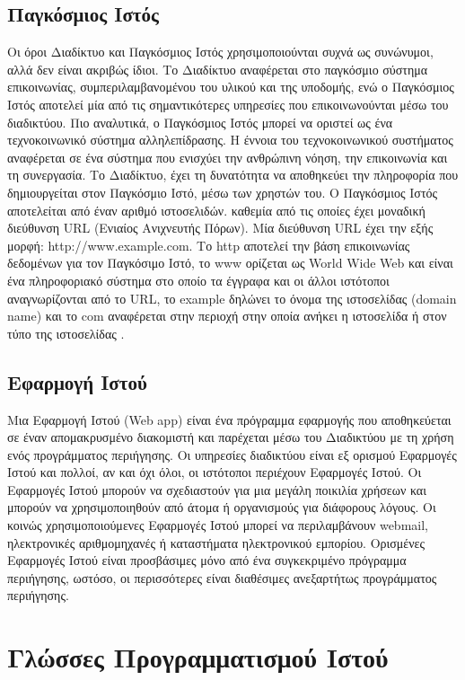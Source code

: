 \subsection{Παγκόσμιος Ιστός}
Οι όροι Διαδίκτυο και Παγκόσμιος Ιστός χρησιμοποιούνται συχνά ως συνώνυμοι, αλλά δεν είναι ακριβώς ίδιοι. Το Διαδίκτυο αναφέρεται στο παγκόσμιο σύστημα επικοινωνίας, συμπεριλαμβανομένου του υλικού και της υποδομής, ενώ ο Παγκόσμιος Ιστός αποτελεί μία από τις σημαντικότερες υπηρεσίες που επικοινωνούνται μέσω του διαδικτύου. Πιο αναλυτικά, ο Παγκόσμιος Ιστός μπορεί να οριστεί ως ένα τεχνοκοινωνικό σύστημα αλληλεπίδρασης. Η έννοια του τεχνοκοινωνικού συστήματος αναφέρεται σε ένα σύστημα που ενισχύει την ανθρώπινη νόηση, την επικοινωνία και τη συνεργασία. Το Διαδίκτυο, έχει τη δυνατότητα να αποθηκεύει την πληροφορία που δημιουργείται στον Παγκόσμιο Ιστό, μέσω των χρηστών του. Ο Παγκόσμιος Ιστός αποτελείται από έναν αριθμό ιστοσελιδών. καθεμία από τις οποίες έχει μοναδική διεύθυνση URL (Ενιαίος Ανιχνευτής Πόρων). Μία διεύθυνση URL έχει την εξής μορφή: http://www.example.com. Το http αποτελεί την βάση επικοινωνίας δεδομένων για τον Παγκόσιμο Ιστό, το www ορίζεται ως World Wide Web και είναι ένα πληροφοριακό σύστημα στο οποίο τα έγγραφα και οι άλλοι ιστότοποι αναγνωρίζονται από το URL, το example δηλώνει το όνομα της ιστοσελίδας (domain name) και το com αναφέρεται στην περιοχή στην οποία ανήκει η ιστοσελίδα ή στον τύπο της ιστοσελίδας \cite{aghaei2012evolution}.

\subsection{Εφαρμογή Ιστού}
Μια Εφαρμογή Ιστού (Web app) είναι ένα πρόγραμμα εφαρμογής που αποθηκεύεται σε έναν απομακρυσμένο διακομιστή και παρέχεται μέσω του Διαδικτύου με τη χρήση ενός προγράμματος περιήγησης. Οι υπηρεσίες διαδικτύου είναι εξ ορισμού Εφαρμογές Ιστού και πολλοί, αν και όχι όλοι, οι ιστότοποι περιέχουν Εφαρμογές Ιστού.
Οι Εφαρμογές Ιστού μπορούν να σχεδιαστούν για μια μεγάλη ποικιλία χρήσεων και μπορούν να χρησιμοποιηθούν από άτομα ή οργανισμούς για διάφορους λόγους. Οι κοινώς χρησιμοποιούμενες Εφαρμογές Ιστού μπορεί να περιλαμβάνουν webmail, ηλεκτρονικές αριθμομηχανές ή καταστήματα ηλεκτρονικού εμπορίου. Ορισμένες Εφαρμογές Ιστού είναι προσβάσιμες μόνο από ένα συγκεκριμένο πρόγραμμα περιήγησης, ωστόσο, οι περισσότερες είναι διαθέσιμες ανεξαρτήτως προγράμματος περιήγησης.

\section{Γλώσσες Προγραμματισμού Ιστού}

